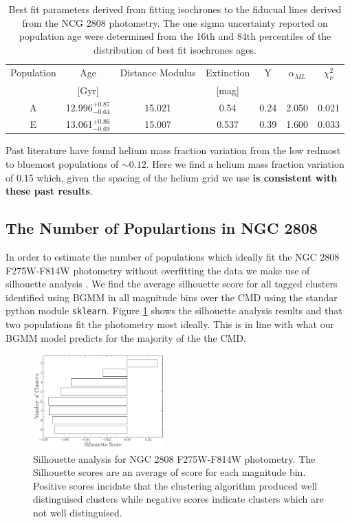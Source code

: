 \begin{table}
  \centering
  \begin{tabular}{c | c c c c c c}
    \hline
    Population & Age & Distance Modulus & Extinction & Y & $\alpha_{ML}$ & $\chi^{2}_{\nu}$\\
    & [Gyr] & & [mag] & & &\\
    \hline
    \hline
    A & 12.996$^{+0.87}_{-0.64}$ & 15.021 & 0.54 & 0.24 & 2.050 & 0.021\\
    E & 13.061$^{+0.86}_{-0.69}$ & 15.007 & 0.537 & 0.39 & 1.600 & 0.033 \\
    \hline
  \end{tabular}
  \caption{Best fit parameters derived from fitting isochrones to the fiducual lines derived from the NCG 2808 photometry. The one sigma uncertainty reported on population age were determined from the 16th and 84th percentiles of the distribution of best fit isochrones ages.}
  \label{tab:BestFitResults}
\end{table}


Past literature \citep[e.g. ][]{Milone2015, Milone2018} have found helium mass
fraction variation from the low redmost to bluemost populations of $\sim 0.12$.
Here we find a helium mass fraction variation of 0.15 which, given the spacing
of the helium grid we use \textbf{is consistent with these past results}.

\subsection{The Number of Populartions in NGC 2808}
In order to estimate the number of populations which ideally fit the NGC 2808
F275W-F814W photometry without overfitting the data we make use of silhouette
analysis \citep[][and in a similar manner to how \citet{Valle2022} preform
their analysis of spectroscopic data]{ROUSSEEUW198753}. We find the average
silhouette score for all tagged clusters identified using BGMM in all magnitude
bins over the CMD using the standar python module \texttt{sklearn}. Figure
\ref{fig:clusterAn} shows the silhouette analysis results and that two
populations fit the photometry most ideally. This is in line with what our BGMM
model predicts for the majority of the the CMD.

\begin{figure}
  \centering
  \includegraphics[width=0.45\textwidth]{ClusterAnalysis.pdf}
  \caption{Silhouette analysis for NGC 2808 F275W-F814W photometry. The Silhouette scores
  are an average of score for each magnitude bin. Positive scores incidate that the clustering
  algorithm produced well distinguised clusters while negative scores indicate clusters which are not
  well distinguised.}
  \label{fig:clusterAn}
\end{figure}


